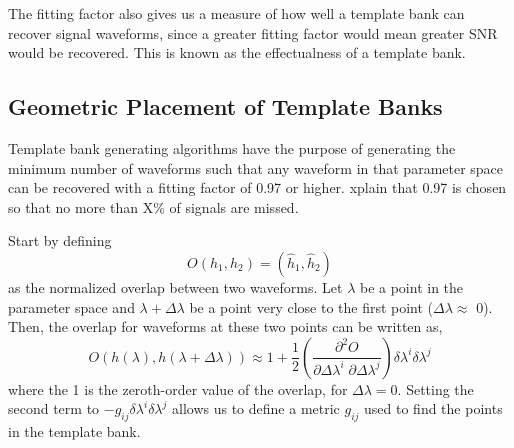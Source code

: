 \documentclass{article}
\newcommand{\red}[1]{{\color{red}{#1}\xspace}}
\begin{document}
The fitting factor also gives us a measure of how well a template bank can recover signal waveforms, since a greater fitting factor would mean greater SNR would be recovered. This is known as the effectualness of a template bank.  

\subsection{Geometric Placement of Template Banks} \label{GeomTmplBank}
Template bank generating algorithms have the purpose of generating the minimum number of waveforms such that any waveform in that parameter space can be recovered with a fitting factor of 0.97 or higher.
{\red Explain that 0.97 is chosen so that no more than  X\% of signals
are missed.}

Start by defining
\begin{equation}
    O(h_1, h_2) = \left( \hat{h}_1, \hat{h}_2\right)
\end{equation}
as the normalized overlap between two waveforms. Let $\lambda$ be a point in the parameter space and $\lambda + \Delta\lambda$ be a point very close to the first point ($\Delta\lambda \approx $ 0).
Then, the overlap for waveforms at these two points can be written as,
\begin{equation}
    O(h(\lambda), h(\lambda + \Delta\lambda)) \approx 1 + \frac{1}{2} \left (\frac{\partial^2O}{\partial\Delta\lambda^i \; \partial\Delta\lambda^j} \right) \delta\lambda^i \delta\lambda^j
\end{equation}
\red{Explain why the first-order term is zero}
where the 1 is the zeroth-order value of the overlap, for $\Delta\lambda = 0$. Setting the second term
 to $-g_{ij}\delta\lambda^i \delta\lambda^j$ allows us to define a metric $g_{ij}$ used to find the points in the template bank.

\red{You need a few more sentences here explaining how you actually place
points using the metric.}
\end{document}

